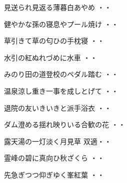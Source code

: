 \vspace{0.6cm}
\begin{shiika}見送られ見返る薄暮白あやめ
\hfill{・・}\end{shiika}
\vspace{0.6cm}
\begin{shiika}健やかな孫の寝息やプール焼け
\hfill{・・}\end{shiika}
\vspace{0.6cm}
\begin{shiika}草引きて草の匂ひの手枕寝
\hfill{・・}\end{shiika}
\vspace{0.6cm}
\begin{shiika}水引の紅ぬれづめに水車
\hfill{・・}\end{shiika}
\vspace{0.6cm}
\begin{shiika}みのり田の道登校のペダル踏む
\hfill{・・}\end{shiika}
\vspace{0.6cm}
\begin{shiika}温泉涼し重き一事を成しとげて
\hfill{・・}\end{shiika}
\vspace{0.6cm}
\begin{shiika}退院の友いきいきと派手浴衣
\hfill{・・}\end{shiika}
\vspace{0.6cm}
\begin{shiika}ダム澄める揺れ映りいる合歓の花
\hfill{・・}\end{shiika}
\vspace{0.6cm}
\begin{shiika}露天湯の一灯淡く月見草
\hfill{双適・・}\end{shiika}
\vspace{0.6cm}
\begin{shiika}霊峰の碧に真向ひ秋ざくら
\hfill{・・}\end{shiika}
\vspace{0.6cm}
\begin{shiika}先急ぎつつ仰ぎゆく峯紅葉
\hfill{・・}\end{shiika}

